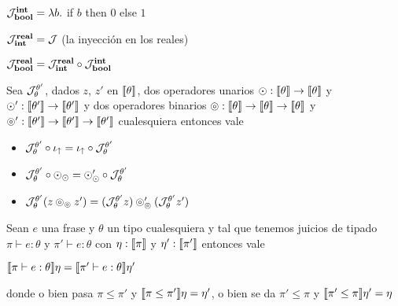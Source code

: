 $\mathcal{J}_{\textbf{bool}}^{\textbf{int}} = \lambda b .$ if $b$ then $0$ else $1$\\
\indent

$\mathcal{J}_{\textbf{int}}^{\textbf{real}} = \mathcal{J}$ (la inyecci\'on en los reales)\\
\indent

$\mathcal{J}_{\textbf{bool}}^{\textbf{real}} = \mathcal{J}_{\textbf{int}}^{\textbf{real}} \circ \mathcal{J}_{\textbf{bool}}^{\textbf{int}}$\\

\begin{proposition}
Sea $\mathcal{J}_{\theta}^{\theta'}$, dados $z$, $z'$ en $\llbracket \theta \rrbracket$, dos operadores
unarios $\odot : \llbracket \theta \rrbracket \rightarrow \llbracket \theta \rrbracket$ y 
$\odot' : \llbracket \theta' \rrbracket \rightarrow \llbracket \theta' \rrbracket$ y dos operadores
binarios $\circledcirc : \llbracket \theta \rrbracket \rightarrow 
		\llbracket \theta \rrbracket \rightarrow \llbracket \theta \rrbracket$ y
$\circledcirc' : \llbracket \theta' \rrbracket \rightarrow 
		\llbracket \theta' \rrbracket \rightarrow \llbracket \theta' \rrbracket$
cualesquiera entonces vale

\begin{itemize}
\item $\mathcal{J}_{\theta}^{\theta'} \circ \iota_{\uparrow} = \iota_{\uparrow} \circ \mathcal{J}_{\theta}^{\theta'}$
\item $\mathcal{J}_{\theta}^{\theta'} \circ \odot_{\odot} = \odot'_{\odot} \circ \mathcal{J}_{\theta}^{\theta'}$
\item $\mathcal{J}_{\theta}^{\theta'} (z \circledcirc_{\circledcirc} z')= 
			(\mathcal{J}_{\theta}^{\theta'} z) \circledcirc'_{\circledcirc} (\mathcal{J}_{\theta}^{\theta'} z')$

\end{itemize}

\end{proposition}

\newpage

\begin{lemma}
Sean $e$ una frase y $\theta$ un tipo cualesquiera y tal que tenemos 
juicios de tipado $\pi \vdash e : \theta$ y $\pi' \vdash e : \theta$
con $\eta : \llbracket \pi \rrbracket$ y $\eta' : \llbracket \pi' \rrbracket$ entonces vale

\begin{center}
$\llbracket \pi \vdash e : \theta \rrbracket\eta = \llbracket \pi' \vdash e : \theta \rrbracket\eta'$
\end{center}

\noindent
donde o bien pasa $\pi \leq \pi'$ y $\llbracket \pi \leq \pi' \rrbracket\eta = \eta'$,
o bien se da $\pi' \leq \pi$ y $\llbracket \pi' \leq \pi \rrbracket\eta' = \eta$

\end{lemma}

